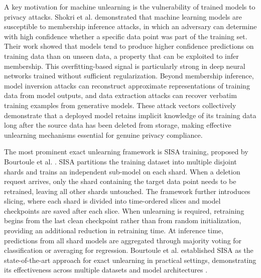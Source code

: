 A key motivation for machine unlearning is the vulnerability of trained models to privacy attacks. Shokri et al. \cite{shokri2017membership} demonstrated that machine learning models are susceptible to membership inference attacks, in which an adversary can determine with high confidence whether a specific data point was part of the training set. Their work showed that models tend to produce higher confidence predictions on training data than on unseen data, a property that can be exploited to infer membership. This overfitting-based signal is particularly strong in deep neural networks trained without sufficient regularization. Beyond membership inference, model inversion attacks can reconstruct approximate representations of training data from model outputs, and data extraction attacks can recover verbatim training examples from generative models. These attack vectors collectively demonstrate that a deployed model retains implicit knowledge of its training data long after the source data has been deleted from storage, making effective unlearning mechanisms essential for genuine privacy compliance.

The most prominent exact unlearning framework is SISA training, proposed by Bourtoule et al. \cite{bourtoule2021machine}. SISA partitions the training dataset into multiple disjoint shards and trains an independent sub-model on each shard. When a deletion request arrives, only the shard containing the target data point needs to be retrained, leaving all other shards untouched. The framework further introduces slicing, where each shard is divided into time-ordered slices and model checkpoints are saved after each slice. When unlearning is required, retraining begins from the last clean checkpoint rather than from random initialization, providing an additional reduction in retraining time. At inference time, predictions from all shard models are aggregated through majority voting for classification or averaging for regression. Bourtoule et al. established SISA as the state-of-the-art approach for exact unlearning in practical settings, demonstrating its effectiveness across multiple datasets and model architectures \cite{bourtoule2021machine}.

